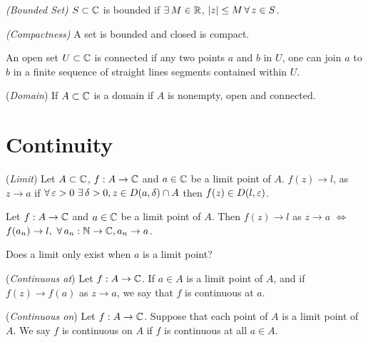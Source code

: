 \documentclass{article}
\begin{document}
\begin{ndefi}{\textit{(Bounded Set)}}
  $S\subset \mathbb{C}$ is bounded if $\exists\, M\in\mathbb{R}$, $|z| \le M\,\forall\, z\in S$.
\end{ndefi}

\begin{ndefi}{\textit{(Compactness)}}
  A set is bounded and closed is compact.
\end{ndefi}

\begin{ndefi}
  An open set $U\subset \mathbb{C}$ is connected if any two points $a$ and $b$ in $U$, one can join $a$ to $b$ in a finite sequence of straight lines segments contained within $U$.
\end{ndefi}

\begin{ndefi}{(\textit{Domain})}
  If $A\subset \mathbb{C}$ is a domain if $A$ is nonempty, open and connected.
\end{ndefi}

\section{Continuity}

\begin{ndefi}{(\textit{Limit})}
  Let $A \subset \mathbb{C}$, $f : A \to \mathbb{C}$ and $a\in\mathbb{C}$ be a limit point of $A$. $f(z) \to l$, as $z \to a$ if $\forall\, \varepsilon > 0 \,\,\exists\, \delta > 0, z\in D(a, \delta)\cap A$ then $f(z) \in D(l, \varepsilon)$.
\end{ndefi}

\begin{nthm}
  Let $f : A \to \mathbb{C}$ and $a\in\mathbb{C}$ be a limit point of $A$. Then $f(z) \to l$ as $z \to a$ $\iff$ $f(a_n) \to l,\,\, \forall\, a_n : \mathbb{N} \to \mathbb{C}, a_n \to a$.
\end{nthm}

{\color{red}\begin{question}
  Does a limit only exist when $a$ is a limit point?
\end{question}}

\begin{ndefi}{(\textit{Continuous at})}
  Let $f : A \to \mathbb{C}$. If $a\in A$ is a limit point of $A$, and if $f(z) \to f(a)$ as $z \to a$, we say that $f$ is continuous at $a$.
\end{ndefi}

\begin{ndefi}{(\textit{Continuous on})}
  Let $f : A \to \mathbb{C}$. Suppose that each point of $A$ is a limit point of $A$. We say $f$ is continuous on $A$ if $f$ is continuous at all $a\in A$.
\end{ndefi}
\end{document}
